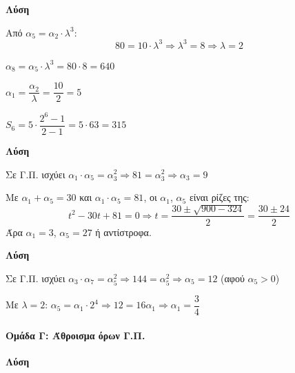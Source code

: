 \documentclass[11pt,a4paper,modern]{FFExercises}
\begin{document}
\askhsh
\textbf{Λύση}
\begin{alist}
  \item Από $\alpha_5 = \alpha_2 \cdot \lambda^3$:
  \[
  80 = 10 \cdot \lambda^3 \Rightarrow \lambda^3 = 8 \Rightarrow \lambda = 2
  \]
  
  \item $\alpha_8 = \alpha_5 \cdot \lambda^3 = 80 \cdot 8 = 640$
  
  \item $\alpha_1 = \dfrac{\alpha_2}{\lambda} = \dfrac{10}{2} = 5$
  
  $S_6 = 5 \cdot \dfrac{2^6 - 1}{2 - 1} = 5 \cdot 63 = 315$
\end{alist}

\askhsh
\textbf{Λύση}
\begin{alist}
  \item Σε Γ.Π. ισχύει $\alpha_1 \cdot \alpha_5 = \alpha_3^2 \Rightarrow 81 = \alpha_3^2 \Rightarrow \alpha_3 = 9$
  
  \item Με $\alpha_1 + \alpha_5 = 30$ και $\alpha_1 \cdot \alpha_5 = 81$, οι $\alpha_1$, $\alpha_5$ είναι ρίζες της:
  \[
  t^2 - 30t + 81 = 0 \Rightarrow t = \frac{30 \pm \sqrt{900-324}}{2} = \frac{30 \pm 24}{2}
  \]
  Άρα $\alpha_1 = 3$, $\alpha_5 = 27$ ή αντίστροφα.
\end{alist}

\askhsh
\textbf{Λύση}
\begin{alist}
  \item Σε Γ.Π. ισχύει $\alpha_3 \cdot \alpha_7 = \alpha_5^2 \Rightarrow 144 = \alpha_5^2 \Rightarrow \alpha_5 = 12$ (αφού $\alpha_5 > 0$)
  
  \item Με $\lambda = 2$: $\alpha_5 = \alpha_1 \cdot 2^4 \Rightarrow 12 = 16\alpha_1 \Rightarrow \alpha_1 = \dfrac{3}{4}$
\end{alist}


\paragraph{Ομάδα Γ: Άθροισμα όρων Γ.Π.}

\askhsh
\textbf{Λύση}
\end{document}
